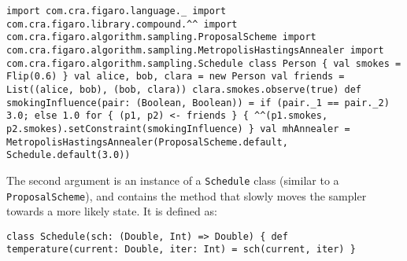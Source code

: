 \begin{flushleft}
\texttt{import com.cra.figaro.language.\_
\newline import com.cra.figaro.library.compound.\textasciicircum\textasciicircum
\newline import com.cra.figaro.algorithm.sampling.ProposalScheme
\newline import com.cra.figaro.algorithm.sampling.MetropolisHastingsAnnealer 
\newline import com.cra.figaro.algorithm.sampling.Schedule
\newline 
\newline class Person \{
\newline \tab val smokes = Flip(0.6)
\newline \}
\newline 
\newline val alice, bob, clara = new Person
\newline val friends = List((alice, bob), (bob, clara))
\newline clara.smokes.observe(true)
\newline 
\newline def smokingInfluence(pair: (Boolean, Boolean)) =
\newline \tab if (pair.\_1 == pair.\_2) 3.0; else 1.0
\newline 
\newline for \{ (p1, p2) <- friends \} \{
\newline \tab \textasciicircum\textasciicircum(p1.smokes, p2.smokes).setConstraint(smokingInfluence)
\newline \}
\newline 
\newline val mhAnnealer = MetropolisHastingsAnnealer(ProposalScheme.default, Schedule.default(3.0)) }
\end{flushleft}

The second argument is an instance of a \texttt{Schedule} class (similar to a \texttt{ProposalScheme}), and contains the method that slowly moves the sampler towards a more likely state. It is defined as:

\begin{flushleft}
\texttt{class Schedule(sch: (Double, Int) => Double) \{
\newline \tab def temperature(current: Double, iter: Int) = sch(current, iter)
\newline \} }
\end{flushleft}

